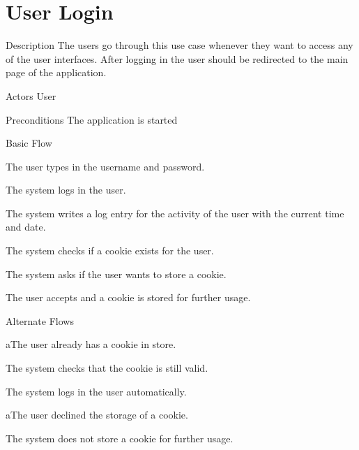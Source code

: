 \section{User Login}

\begin{cpart}{Description}
The users go through this use case whenever they want to access any of the user interfaces. After logging in the user should be redirected to the main page of the application.
\end{cpart}

\begin{cpart}{Actors}
User
\end{cpart}

\begin{cpart}{Preconditions}
The application is started
\end{cpart}

\begin{cpartList}{Basic Flow}
  \item The user types in the username and password.
  \item The system logs in the user.
  \item The system writes a log entry for the activity of the user with the current time and date.
  \item The system checks if a cookie exists for the user.
  \item The system asks if the user wants to store a cookie.
  \item The user accepts and a cookie is stored for further usage.
\end{cpartList}

\begin{cpartList}{Alternate Flows}
  \begin{innerList}{1}{a}{The user already has a cookie in store.}
    \item The system checks that the cookie is still valid.
    \item The system logs in the user automatically.
  \end{innerList}
  \begin{innerList}{5}{a}{The user declined the storage of a cookie.}
    \item The system does not store a cookie for further usage.
  \end{innerList}
\end{cpartList}

